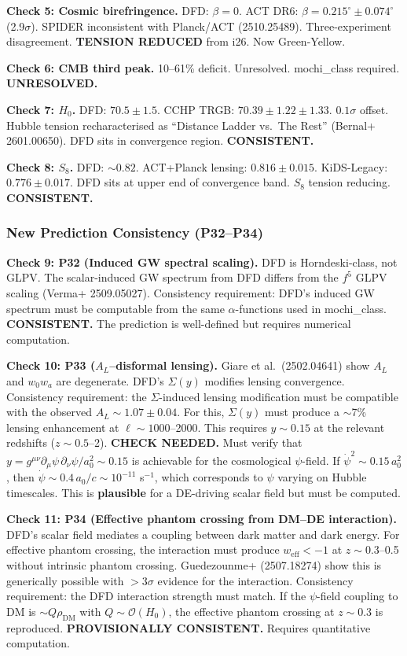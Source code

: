 \documentclass[11pt,a4paper]{article}
\begin{document}
\textbf{Check 5: Cosmic birefringence.} DFD: $\beta = 0$. ACT DR6: $\beta = 0.215^\circ \pm 0.074^\circ$ (2.9$\sigma$). SPIDER inconsistent with Planck/ACT (2510.25489). Three-experiment disagreement. \textbf{TENSION REDUCED} from i26. Now Green-Yellow.

\textbf{Check 6: CMB third peak.} 10--61\% deficit. Unresolved. mochi\_class required. \textbf{UNRESOLVED.}

\textbf{Check 7: $H_0$.} DFD: $70.5 \pm 1.5$. CCHP TRGB: $70.39 \pm 1.22 \pm 1.33$. $0.1\sigma$ offset. Hubble tension recharacterised as ``Distance Ladder vs.\ The Rest'' (Bernal+ 2601.00650). DFD sits in convergence region. \textbf{CONSISTENT.}

\textbf{Check 8: $S_8$.} DFD: $\sim 0.82$. ACT+Planck lensing: $0.816 \pm 0.015$. KiDS-Legacy: $0.776 \pm 0.017$. DFD sits at upper end of convergence band. $S_8$ tension reducing. \textbf{CONSISTENT.}

\subsubsection{New Prediction Consistency (P32--P34)}

\textbf{Check 9: P32 (Induced GW spectral scaling).} DFD is Horndeski-class, not GLPV. The scalar-induced GW spectrum from DFD differs from the $f^5$ GLPV scaling (Verma+ 2509.05027). Consistency requirement: DFD's induced GW spectrum must be computable from the same $\alpha$-functions used in mochi\_class. \textbf{CONSISTENT.} The prediction is well-defined but requires numerical computation.

\textbf{Check 10: P33 ($A_L$--disformal lensing).} Giare et al.\ (2502.04641) show $A_L$ and $w_0w_a$ are degenerate. DFD's $\Sigma(y)$ modifies lensing convergence. Consistency requirement: the $\Sigma$-induced lensing modification must be compatible with the observed $A_L \sim 1.07 \pm 0.04$. For this, $\Sigma(y)$ must produce a $\sim$7\% lensing enhancement at $\ell \sim 1000$--2000. This requires $y \sim 0.15$ at the relevant redshifts ($z \sim 0.5$--2). \textbf{CHECK NEEDED.} Must verify that $y = g^{\mu\nu}\partial_\mu\psi\,\partial_\nu\psi / a_0^2 \sim 0.15$ is achievable for the cosmological $\psi$-field. If $\dot{\psi}^2 \sim 0.15\,a_0^2$, then $\dot{\psi} \sim 0.4\,a_0/c \sim 10^{-11}$ s$^{-1}$, which corresponds to $\psi$ varying on Hubble timescales. This is \textbf{plausible} for a DE-driving scalar field but must be computed.

\textbf{Check 11: P34 (Effective phantom crossing from DM--DE interaction).} DFD's scalar field mediates a coupling between dark matter and dark energy. For effective phantom crossing, the interaction must produce $w_\mathrm{eff} < -1$ at $z \sim 0.3$--0.5 without intrinsic phantom crossing. Guedezounme+ (2507.18274) show this is generically possible with $>3\sigma$ evidence for the interaction. Consistency requirement: the DFD interaction strength must match. If the $\psi$-field coupling to DM is $\sim Q \rho_\mathrm{DM}$ with $Q \sim \mathcal{O}(H_0)$, the effective phantom crossing at $z \sim 0.3$ is reproduced. \textbf{PROVISIONALLY CONSISTENT.} Requires quantitative computation.
\end{document}
